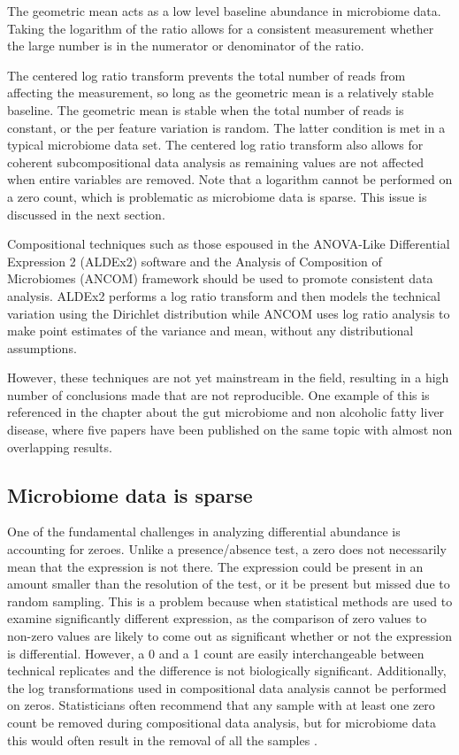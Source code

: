 The geometric mean acts as a low level baseline abundance in microbiome data. Taking the logarithm of the ratio allows for a consistent measurement whether the large number is in the numerator or denominator of the ratio.

The centered log ratio transform prevents the total number of reads from affecting the measurement, so long as the geometric mean is a relatively stable baseline. The geometric mean is stable when the total number of reads is constant, or the per feature variation is random. The latter condition is met in a typical microbiome data set. The centered log ratio transform also allows for coherent subcompositional data analysis as remaining values are not affected when entire variables are removed. Note that a logarithm cannot be performed on a zero count, which is problematic as microbiome data is sparse. This issue is discussed in the next section.

Compositional techniques such as those espoused in the ANOVA-Like Differential Expression 2 (ALDEx2) software \cite{fernandes2014unifying} and the Analysis of Composition of Microbiomes (ANCOM) framework \cite{mandal2015analysis} should be used to promote consistent data analysis. ALDEx2 performs a log ratio transform and then models the technical variation using the Dirichlet distribution while ANCOM uses log ratio analysis to make point estimates of the variance and mean, without any distributional assumptions.

However, these techniques are not yet mainstream in the field, resulting in a high number of conclusions made that are not reproducible. One example of this is referenced in the chapter about the gut microbiome and non alcoholic fatty liver disease, where five papers have been published on the same topic with almost non overlapping results.

\subsection{Microbiome data is sparse}
One of the fundamental challenges in analyzing differential abundance is accounting for zeroes. Unlike a presence/absence test, a zero does not necessarily mean that the expression is not there. The expression could be present in an amount smaller than the resolution of the test, or it be present but missed due to random sampling. This is a problem because when statistical methods are used to examine significantly different expression, as the comparison of zero values to non-zero values are likely to come out as significant whether or not the expression is differential. However, a 0 and a 1 count are easily interchangeable between technical replicates and the difference is not biologically significant. Additionally, the log transformations used in compositional data analysis cannot be performed on zeros. Statisticians often recommend that any sample with at least one zero count be removed during compositional data analysis, but for microbiome data this would often result in the removal of all the samples \cite{aitchison1982statistical}.

